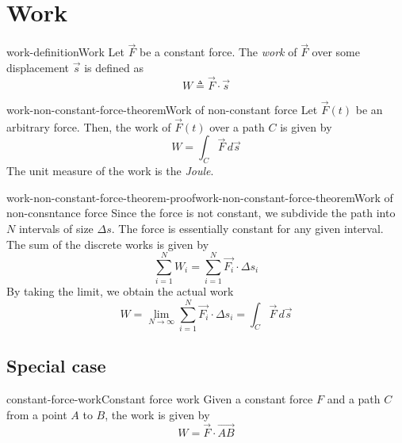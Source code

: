 \documentclass[preview]{standalone}
\begin{document}
\genpage

\section{Work}

\begin{snippetdefinition}{work-definition}{Work}
    Let \(\vec{F}\) be a constant force. The \emph{work}
    of \(\vec{F}\) over some displacement \(\vec{s}\) is defined as
    \[
        W \triangleq \vec{F} \cdot \vec{s}
    \]
\end{snippetdefinition}

\begin{snippettheorem}{work-non-constant-force-theorem}{Work of non-constant force}
    Let \(\vec{F}(t)\) be an arbitrary force. Then, the work
    of \(\vec{F}(t)\) over a path \(C\) is given by
    \[
        W = \int_C \vec{F}\,d\vec{s}
    \]
    The unit measure of the work is the \emph{Joule}.
\end{snippettheorem}


\begin{snippetproof}{work-non-constant-force-theorem-proof}{work-non-constant-force-theorem}{Work of non-consntance force}
    Since the force is not constant, we subdivide the path into \(N\) intervals of size \(\Delta s\).
    The force is essentially constant for any given interval. The sum of the discrete works is given by
    \[
        \sum_{i=1}^N W_i = \sum_{i=1}^N \vec{F_i} \cdot \Delta s_i
    \]
    By taking the limit, we obtain the actual work
    \[
        W = \lim_{N \to \infty} \sum_{i=1}^N \vec{F_i} \cdot \Delta s_i
        = \int_C \vec{F}\,d\vec{s}
    \]
\end{snippetproof}


\subsection{Special case}

\begin{snippetproposition}{constant-force-work}{Constant force work}
    Given a constant force \(F\) and a path \(C\) from a point \(A\) to \(B\), the work is given by
    \[
        W = \vec{F} \cdot \vec{AB}
    \]
\end{snippetproposition}
\end{document}
